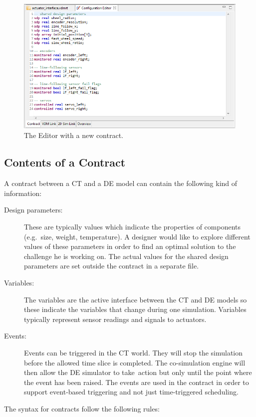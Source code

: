 \documentclass{crescendorepchap}
\begin{document}
\begin{figure}[htbp]
\centering
\includegraphics[width=.6\textwidth]{images/DestecsEditorNewContract.png}
\caption{The Editor with a new contract.\label{fig:editorcontract2}}
\end{figure}

\subsection{Contents of a Contract}

A contract between a CT and a DE model can contain the following kind of
information:

\begin{description}
\item[Design parameters:] These are typically values which indicate
  the properties of components (e.g.~size, weight, temperature). A
  designer would like to explore different values of these parameters in
  order to find an optimal solution to the challenge he is working on.
  The actual values for the shared design parameters are set outside the
  contract in a separate file.
\item[Variables:] The variables are the active interface between the
  CT and DE models so these indicate the variables that change during
  one simulation. Variables typically represent sensor readings and
  signals to actuators.
\item[Events:] Events can be triggered in the CT world. They
  will stop the simulation before the allowed time slice is completed.
  The co-simulation engine will then allow the DE simulator to
  take~action but only until the point where the event has been raised.
  The events are used in the contract in order to support event-based
  triggering and not just time-triggered scheduling.
\end{description}

The syntax for contracts follow the following rules:
\end{document}
